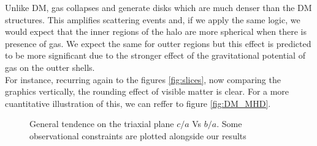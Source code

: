  Unlike DM, gas collapses and generate disks which are much denser than the DM structures. This amplifies scattering events and, if we apply the same logic, we would expect that the inner regions of the halo are more spherical when there is presence of gas. We expect the same for outter regions but this effect is predicted to be more significant due to the stronger effect of the gravitational potential of gas on the outter shells.\\

For instance, recurring again to the figures \ref{fig:slices}, now comparing the graphics vertically, the rounding effect of visible matter is clear. For a more cuantitative illustration of this, we can reffer to figure \ref{fig:DM_MHD}. \\
\begin{figure}[!ht]
  \centering
  \hfill
  \hfill
  \caption{General tendence on the triaxial plane $c/a$ Vs $b/a$. Some observational constraints are plotted alongside our results}
  \label{fig:Triaxiality_DM_MHD}
\end{figure}

